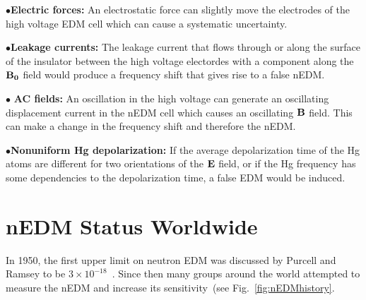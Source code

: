 \begin{description}
\item{$\bullet$\bf{Electric forces:}} An electrostatic force can
  slightly move the electrodes of the high voltage EDM cell which can
  cause a systematic uncertainty.

\item{$\bullet$\bf{Leakage currents:}} The leakage current that flows
  through or along the surface of the insulator between the high
  voltage electordes with a component along the $\bf{B_0}$ field would
  produce a frequency shift that gives rise to a false nEDM.

\item{$\bullet$ \bf{AC fields:}} An oscillation in the high voltage
  can generate an oscillating displacement current in the nEDM cell
  which causes an oscillating $\bf{B}$ field. This can make a change
  in the frequency shift and therefore the nEDM.

\item{$\bullet$\bf{Nonuniform Hg depolarization:}} If the average
  depolarization time of the Hg atoms are different for two
  orientations of the $\bf{E}$ field, or if the Hg frequency has some
  dependencies to the depolarization time, a false EDM would be
  induced.

\end{description}







\section{nEDM Status Worldwide}
In 1950, the first upper limit on neutron EDM was discussed by Purcell
and Ramsey to be $3 \times 10^{-18}$~\cite{PhysRev.78.807}. Since then
many groups around the world attempted to measure the nEDM and
increase its sensitivity~(see Fig.~\ref{fig:nEDMhistory}.

